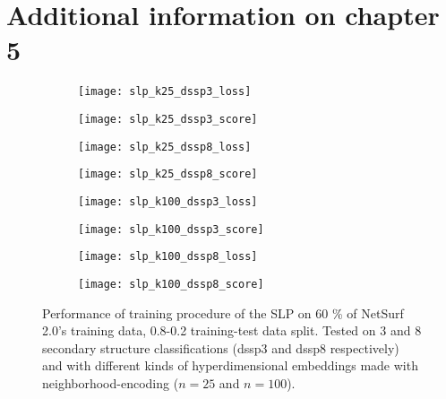 \chapter{Additional information on chapter 5}\label{app:chp5}
\begin{figure}[htbp]
    \centering
    \begin{subfigure}{0.48\textwidth}
        \texttt{[image: slp\_k25\_dssp3\_loss]}
        \label{fig:subfig}
    \end{subfigure}
    \hfill
    \begin{subfigure}{0.48\textwidth}
        \texttt{[image: slp\_k25\_dssp3\_score]}
        \label{fig:subfi}
    \end{subfigure}
    
    \begin{subfigure}{0.48\textwidth}
        \texttt{[image: slp\_k25\_dssp8\_loss]}
        \label{fig:subf}
    \end{subfigure}
    \hfill
    \begin{subfigure}{0.48\textwidth}
        \texttt{[image: slp\_k25\_dssp8\_score]}
        \label{fig:sub}
    \end{subfigure}
    
    \begin{subfigure}{0.48\textwidth}
        \texttt{[image: slp\_k100\_dssp3\_loss]}
        \label{fig:su}
    \end{subfigure}
    \hfill
    \begin{subfigure}{0.48\textwidth}
        \texttt{[image: slp\_k100\_dssp3\_score]}
        \label{fig:s}
    \end{subfigure}
    
    \begin{subfigure}{0.48\textwidth}
        \texttt{[image: slp\_k100\_dssp8\_loss]}
        \label{fig:sg}
    \end{subfigure}
    \hfill
    \begin{subfigure}{0.48\textwidth}
        \texttt{[image: slp\_k100\_dssp8\_score]}
        \label{fig:sh}
    \end{subfigure}
    \caption{Performance of training procedure of the SLP on 60 \% of NetSurf 2.0's training data, 0.8-0.2 training-test data split. Tested on 3 and 8 secondary structure classifications (dssp3 and dssp8 respectively) and with different kinds of hyperdimensional embeddings made with neighborhood-encoding ($n = 25$ and $n=100$).}
    \label{fig:main8}
  \end{figure}

